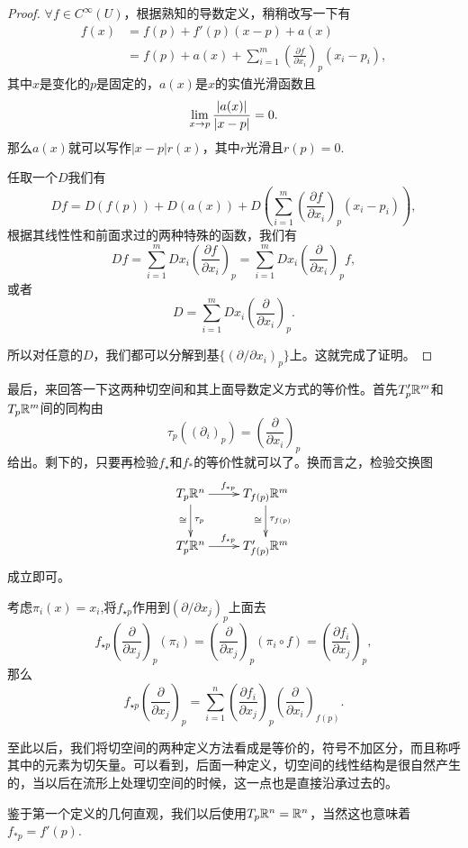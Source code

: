 \documentclass[8pt]{book}
\theoremstyle{plain}%
\begin{document}
\begin{proof}
	$\forall f\in C^\infty(U)$，根据熟知的导数定义，稍稍改写一下有
	\[
		\begin{split}
			f(x)&=f(p)+f'(p)(x-p)+a(x)\\
			&=f(p)+a(x)+\sum_{i=1}^m \left(\frac{\partial f}{\partial x_i}\right)_p(x_i-p_i),
		\end{split}
	\]
	其中$x$是变化的$p$是固定的，$a(x)$是$x$的实值光滑函数且
	\[
		\lim_{x\to p}\frac{\arrowvert a(x)\arrowvert }{\arrowvert x-p\arrowvert }=0.
	\]
	那么$a(x)$就可以写作$|x-p|r(x)$，其中$r$光滑且$r(p)=0$.

	任取一个$D$我们有
	\[
		Df=D\left(f(p)\right)+D\left(a(x)\right)+D\left(\sum_{i=1}^m \left(\frac{\partial f}{\partial x_i}\right)_p(x_i-p_i)\right),
	\]
	根据其线性性和前面求过的两种特殊的函数，我们有
	\[
		Df=\sum_{i=1}^m Dx_i\left(\frac{\partial f}{\partial x_i}\right)_p=\sum_{i=1}^m Dx_i\left(\frac{\partial }{\partial x_i}\right)_pf,
	\]
	或者
	\[
		D=\sum_{i=1}^m Dx_i\left(\frac{\partial }{\partial x_i}\right)_p.
	\]
	
	所以对任意的$D$，我们都可以分解到基$\{\left(\partial/\partial x_i\right)_p\}$上。这就完成了证明。
\end{proof}

最后，来回答一下这两种切空间和其上面导数定义方式的等价性。首先$T'_p\mathbb{R}^m$和$T_p\mathbb{R}^m$间的同构由
\[
	\tau_p\left((\partial_i)_p\right)=\left(\frac{\partial }{\partial x_i}\right)_p
\]
给出。剩下的，只要再检验$f_\star$和$f_*$的等价性就可以了。换而言之，检验交换图
\[
	\xymatrix{
	T_{p}\rr^n\ar[d]_\cong^{\tau_p}\ar[r]^{f_{*p}}&T_{f(p)}\rr^m\ar[d]_\cong^{\tau_{f(p)}}\\
	T'_{p}\rr^n\ar[r]^{f_{\star p}}&T'_{f(p)}\rr^m
	}
\]
成立即可。

考虑$\pi_i(x)=x_i$,将$f_{\star p}$作用到$\left(\partial/\partial x_j\right)_p$上面去
\[
	f_{\star p}\left(\frac{\partial}{\partial x_j}\right)_p(\pi_i)=\left(\frac{\partial}{\partial x_j}\right)_p(\pi_i\circ f)=\left(\frac{\partial f_i}{\partial x_j}\right)_p,
\]
那么
\[
	f_{\star p}\left(\frac{\partial}{\partial x_j}\right)_p=\sum_{i=1}^n\left(\frac{\partial f_i}{\partial x_j}\right)_p \left(\frac{\partial}{\partial x_i}\right)_{f(p)}.
\]

至此以后，我们将切空间的两种定义方法看成是等价的，符号不加区分，而且称呼其中的元素为切矢量。可以看到，后面一种定义，切空间的线性结构是很自然产生的，当以后在流形上处理切空间的时候，这一点也是直接沿承过去的。

鉴于第一个定义的几何直观，我们以后使用$T_p\mathbb{R}^n=\mathbb{R}^n$，当然这也意味着$f_{*p}=f'(p)$.
\end{document}
